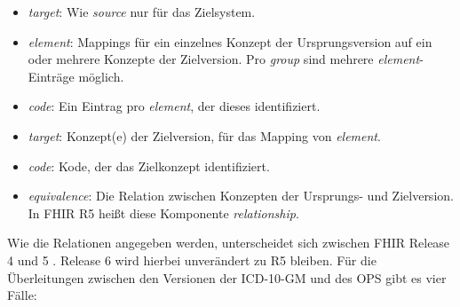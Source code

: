 \begin{itemize}
\item \emph{target}: Wie \emph{source} nur für das Zielsystem. %
\item \emph{element}: Mappings für ein einzelnes Konzept der Ursprungsversion auf ein oder mehrere Konzepte der Zielversion. Pro \emph{group} sind mehrere \emph{element}-Einträge möglich. %
\item \emph{code}: Ein Eintrag pro \emph{element}, der dieses identifiziert. %
\item \emph{target}: Konzept(e) der Zielversion, für das Mapping von \emph{element}. %
\item \emph{code}: Kode, der das Zielkonzept identifiziert. %
\item \emph{equivalence}: Die Relation zwischen Konzepten der Ursprungs- und Zielversion. \newline In FHIR R5 heißt diese Komponente \emph{relationship}. %
\end{itemize}

Wie die Relationen angegeben werden, unterscheidet sich zwischen FHIR Release 4 und 5 \cite{conceptmap-r5}. Release 6 wird hierbei unverändert zu R5 bleiben. Für die Überleitungen zwischen den Versionen der ICD-10-GM und des OPS gibt es vier Fälle: 

